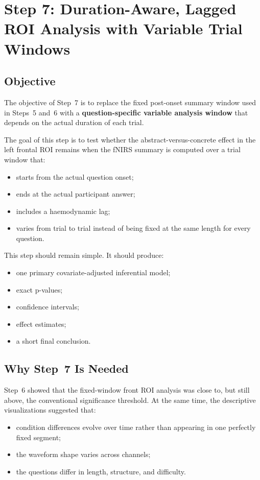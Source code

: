 \documentclass[11pt]{article}
\begin{document}
\sloppy
\section{Step 7: Duration-Aware, Lagged ROI Analysis with Variable Trial Windows}
\label{sec:step7_variable_window}

\subsection{Objective}
The objective of Step~7 is to replace the fixed post-onset summary window used in Steps~5 and~6
with a \textbf{question-specific variable analysis window} that depends on the actual duration of each trial.

The goal of this step is to test whether the abstract-versus-concrete effect in the left frontal ROI
remains when the fNIRS summary is computed over a trial window that:
\begin{itemize}
    \item starts from the actual question onset;
    \item ends at the actual participant answer;
    \item includes a haemodynamic lag;
    \item varies from trial to trial instead of being fixed at the same length for every question.
\end{itemize}

This step should remain simple.
It should produce:
\begin{itemize}
    \item one primary covariate-adjusted inferential model;
    \item exact p-values;
    \item confidence intervals;
    \item effect estimates;
    \item a short final conclusion.
\end{itemize}

\subsection{Why Step~7 Is Needed}
Step~6 showed that the fixed-window front ROI analysis was close to, but still above, the conventional
significance threshold.
At the same time, the descriptive visualizations suggested that:
\begin{itemize}
    \item condition differences evolve over time rather than appearing in one perfectly fixed segment;
    \item the waveform shape varies across channels;
    \item the questions differ in length, structure, and difficulty.
\end{itemize}
\end{document}
